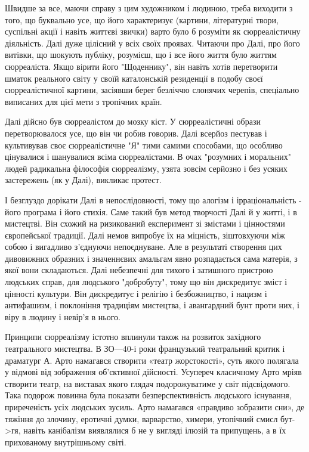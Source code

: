 \documentclass[14pt]{extarticle} %
\begin{document}
Швидше за все, маючи справу з цим художником і людиною, треба виходити з того, що буквально усе, що його характеризує 
(картини, літературні твори, суспільні акції і навіть життєві звички) варто було б розуміти як сюрреалістичну діяльність. Далі дуже цілісний
у всіх своїх проявах. 
Читаючи про Далі, про його витівки, що шокують публіку, розумієш, що і все його життя було життям сюрреаліста. Якщо вірити його
"Щоденнику", він навіть хотів перетворити шматок реального світу у своїй каталонській резиденції в подобу своєї сюрреалістичної картини, засіявши 
берег безліччю слонячих черепів, спеціально виписаних для цієї мети з тропічних країн.

Далі дійсно був сюрреалістом до мозку кіст. У сюрреалістичні образи перетворювалося усе, що він чи робив говорив. Далі всерйоз пестував 
і культивував своє сюрреалістичне "Я" тими самими способами, що особливо цінувалися і шанувалися всіма сюрреалістами. В очах "розумних
і моральних" людей радикальна філософія сюрреалізму, узята зовсім серйозно і без усяких застережень (як у Далі), викликає протест.

І безглуздо дорікати Далі в непослідовності, тому що алогізм і ірраціональність - його програма і його стихія. Саме такий був 
метод творчості Далі й у житті, і в мистецтві. Він схожий на ризикований експеримент зі змістами і цінностями європейської традиції. Далі немов 
випробує їх на міцність, зіштовхуючи між собою і вигадливо з'єднуючи непоєднуване. Але в результаті створення цих дивовижних образних і значеннєвих
амальгам явно розпадається сама матерія, з якої вони складаються. Далі небезпечні для тихого і затишного пристрою людських справ, для людського
"добробуту", тому що він дискредитує зміст і цінності культури. Він дискредитує і релігію і безбожництво, і нацизм і антифашизм, і 
поклоніння традиціям мистецтва, і авангардний бунт проти них, і віру в людину і невір'я в нього.

Принципи сюрреалізму істотно вплинули також на розвиток західного театрального мистецтва. В ЗО—40-і роки французький театральний критик
і драматург А. Арто намагався створити «театр жорстокості», суть якого полягала у відмові від зображення об'єктивної дійсності. Усупереч класичному
Арто мріяв створити театр, на виставах якого глядач подорожуватиме у світ підсвідомого. Така подорож повинна була показати безперспективність 
людського існування, приреченість усіх людських зусиль. Арто намагався «правдиво зобразити сни», де тяжіння до злочину, еротичні думки,
варварство, химери, утопічний смисл бут->гя, навіть канібалізм виявлялися б не у вигляді ілюзій та припущень, а в їх прихованому внутрішньому світі.
\end{document}
